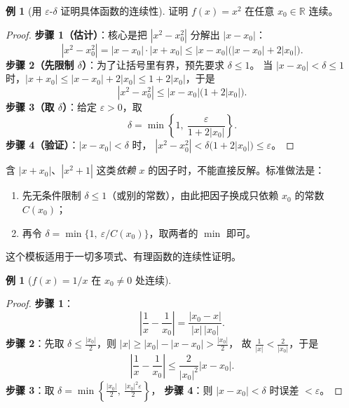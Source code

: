 \documentclass[11pt,a4paper]{ctexart}
\theoremstyle{definition}
\newtheorem{example}[theorem]{例}
\theoremstyle{remark}
\newcommand{\R}{\mathbb{R}}
\newcommand{\eps}{\varepsilon}
\newcommand{\abs}[1]{\left\lvert #1 \right\rvert}
\begin{document}
\begin{example}[用 $\eps$-$\delta$ 证明具体函数的连续性]\label{ex:cont-x2}
证明 $f(x)=x^{2}$ 在任意 $x_0\in\R$ 连续。
\end{example}

\begin{proof}
\textbf{步骤 1（估计）}：核心是把 $\abs{x^2-x_0^2}$ 分解出 $\abs{x-x_0}$：
\[
  \abs{x^{2}-x_0^{2}}=\abs{x-x_0}\cdot\abs{x+x_0}
  \le\abs{x-x_0}\bigl(\abs{x-x_0}+2\abs{x_0}\bigr).
\]
\textbf{步骤 2（先限制 $\delta$）}：为了让括号里有界，预先要求 $\delta\le1$。
当 $\abs{x-x_0}<\delta\le1$ 时，$\abs{x+x_0}\le\abs{x-x_0}+2\abs{x_0}\le1+2\abs{x_0}$，于是
\[
  \abs{x^{2}-x_0^{2}}\le\abs{x-x_0}\bigl(1+2\abs{x_0}\bigr).
\]
\textbf{步骤 3（取 $\delta$）}：给定 $\eps>0$，取
\[
  \delta=\min\left\{1,\ \frac{\eps}{1+2\abs{x_0}}\right\}.
\]
\textbf{步骤 4（验证）}：$\abs{x-x_0}<\delta$ 时，
$\abs{x^2-x_0^2}<\delta\bigl(1+2\abs{x_0}\bigr)\le\eps$。

\end{proof}

\begin{tipbox}
含 $\abs{x+x_0}$、$\abs{x^2+1}$ 这类\emph{依赖 $x$} 的因子时，不能直接反解。标准做法是：
\begin{enumerate}[label=\arabic*., leftmargin=1.8em, topsep=2pt]
  \item 先无条件限制 $\delta\le1$（或别的常数），由此把因子换成只依赖 $x_0$ 的常数 $C(x_0)$；
  \item 再令 $\delta=\min\bigl\{1,\ \eps/C(x_0)\bigr\}$，取两者的 $\min$ 即可。
\end{enumerate}
这个模板适用于一切多项式、有理函数的连续性证明。
\end{tipbox}

\begin{example}[$f(x)=1/x$ 在 $x_0\neq0$ 处连续]\label{ex:cont-recip}
\end{example}

\begin{proof}
\textbf{步骤 1}：
\[
  \abs{\frac1x-\frac1{x_0}}=\frac{\abs{x_0-x}}{\abs{x}\,\abs{x_0}} .
\]
\textbf{步骤 2}：先取 $\delta\le\frac{\abs{x_0}}{2}$，则 $\abs{x}\ge\abs{x_0}-\abs{x-x_0}>\frac{\abs{x_0}}{2}$，
故 $\frac{1}{\abs x}<\frac{2}{\abs{x_0}}$，于是
\[
  \abs{\frac1x-\frac1{x_0}}\le\frac{2}{\abs{x_0}^{2}}\abs{x-x_0}.
\]
\textbf{步骤 3}：取 $\delta=\min\left\{\frac{\abs{x_0}}{2},\ \frac{\abs{x_0}^{2}\eps}{2}\right\}$，
\textbf{步骤 4}：则 $\abs{x-x_0}<\delta$ 时误差 $<\eps$。

\end{proof}
\end{document}
